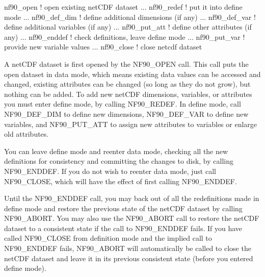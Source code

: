 \begin{DoxyCode}
nf90\_open             \textcolor{comment}{! open existing netCDF dataset}
  ...
nf90\_redef            \textcolor{comment}{! put it into define mode}
    ...
  nf90\_def\_dim        \textcolor{comment}{! define additional dimensions (if any)}
    ...
  nf90\_def\_var        \textcolor{comment}{! define additional variables (if any)}
    ...
  nf90\_put\_att        \textcolor{comment}{! define other attributes (if any)}
    ...
nf90\_enddef           \textcolor{comment}{! check definitions, leave define mode}
    ...
  nf90\_put\_var        \textcolor{comment}{! provide new variable values}
    ...
nf90\_close            ! \textcolor{keyword}{close} netcdf dataset
\end{DoxyCode}


A net\+C\+DF dataset is first opened by the N\+F90\+\_\+\+O\+P\+EN call. This call puts the open dataset in data mode, which means existing data values can be accessed and changed, existing attributes can be changed (so long as they do not grow), but nothing can be added. To add new net\+C\+DF dimensions, variables, or attributes you must enter define mode, by calling N\+F90\+\_\+\+R\+E\+D\+EF. In define mode, call N\+F90\+\_\+\+D\+E\+F\+\_\+\+D\+IM to define new dimensions, N\+F90\+\_\+\+D\+E\+F\+\_\+\+V\+AR to define new variables, and N\+F90\+\_\+\+P\+U\+T\+\_\+\+A\+TT to assign new attributes to variables or enlarge old attributes.

You can leave define mode and reenter data mode, checking all the new definitions for consistency and committing the changes to disk, by calling N\+F90\+\_\+\+E\+N\+D\+D\+EF. If you do not wish to reenter data mode, just call N\+F90\+\_\+\+C\+L\+O\+SE, which will have the effect of first calling N\+F90\+\_\+\+E\+N\+D\+D\+EF.

Until the N\+F90\+\_\+\+E\+N\+D\+D\+EF call, you may back out of all the redefinitions made in define mode and restore the previous state of the net\+C\+DF dataset by calling N\+F90\+\_\+\+A\+B\+O\+RT. You may also use the N\+F90\+\_\+\+A\+B\+O\+RT call to restore the net\+C\+DF dataset to a consistent state if the call to N\+F90\+\_\+\+E\+N\+D\+D\+EF fails. If you have called N\+F90\+\_\+\+C\+L\+O\+SE from definition mode and the implied call to N\+F90\+\_\+\+E\+N\+D\+D\+EF fails, N\+F90\+\_\+\+A\+B\+O\+RT will automatically be called to close the net\+C\+DF dataset and leave it in its previous consistent state (before you entered define mode).

